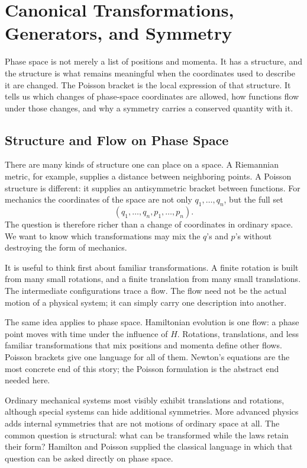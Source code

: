 \chapter{Canonical Transformations, Generators, and Symmetry}

Phase space is not merely a list of positions and momenta. It has a structure,
and the structure is what remains meaningful when the coordinates used to
describe it are changed. The Poisson bracket is the local expression of that
structure. It tells us which changes of phase-space coordinates are allowed,
how functions flow under those changes, and why a symmetry carries a conserved
quantity with it.

\section{Structure and Flow on Phase Space}

There are many kinds of structure one can place on a space. A Riemannian
metric, for example, supplies a distance between neighboring points. A
Poisson structure is different: it supplies an antisymmetric bracket between
functions. For mechanics the coordinates of the space are not only
\(q_1,\ldots,q_n\), but the full set
\[
 (q_1,\ldots,q_n,p_1,\ldots,p_n).
\]
The question is therefore richer than a change of coordinates in ordinary
space. We want to know which transformations may mix the \(q\)'s and \(p\)'s
without destroying the form of mechanics.

It is useful to think first about familiar transformations. A finite rotation
is built from many small rotations, and a finite translation from many small
translations. The intermediate configurations trace a flow. The flow need
not be the actual motion of a physical system; it can simply carry one
description into another.

The same idea applies to phase space. Hamiltonian evolution is one flow: a
phase point moves with time under the influence of \(H\). Rotations,
translations, and less familiar transformations that mix positions and
momenta define other flows. Poisson brackets give one language for all of
them. Newton's equations are the most concrete end of this story; the Poisson
formulation is the abstract end needed here.

Ordinary mechanical systems most visibly exhibit translations and rotations,
although special systems can hide additional symmetries. More advanced
physics adds internal symmetries that are not motions of ordinary space at
all. The common question is structural: what can be transformed while the
laws retain their form? Hamilton and Poisson supplied the classical language
in which that question can be asked directly on phase space.

